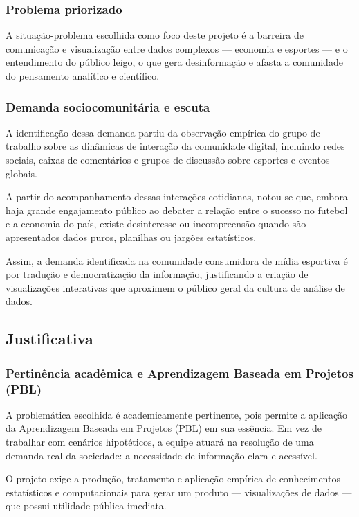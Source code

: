 \documentclass[12pt, a4paper, brazil]{article}
\begin{document}
\subsubsection{Problema priorizado}
A situação-problema escolhida como foco deste projeto é a barreira de comunicação e visualização entre dados complexos — economia e esportes — e o entendimento do público leigo, o que gera desinformação e afasta a comunidade do pensamento analítico e científico.

\subsubsection{Demanda sociocomunitária e escuta}
A identificação dessa demanda partiu da observação empírica do grupo de trabalho sobre as dinâmicas de interação da comunidade digital, incluindo redes sociais, caixas de comentários e grupos de discussão sobre esportes e eventos globais.

A partir do acompanhamento dessas interações cotidianas, notou-se que, embora haja grande engajamento público ao debater a relação entre o sucesso no futebol e a economia do país, existe desinteresse ou incompreensão quando são apresentados dados puros, planilhas ou jargões estatísticos.

Assim, a demanda identificada na comunidade consumidora de mídia esportiva é por tradução e democratização da informação, justificando a criação de visualizações interativas que aproximem o público geral da cultura de análise de dados.

\subsection{Justificativa}

\subsubsection{ Pertinência acadêmica e Aprendizagem Baseada em Projetos (PBL)}
A problemática escolhida é academicamente pertinente, pois permite a aplicação da Aprendizagem Baseada em Projetos (PBL) em sua essência. Em vez de trabalhar com cenários hipotéticos, a equipe atuará na resolução de uma demanda real da sociedade: a necessidade de informação clara e acessível.

O projeto exige a produção, tratamento e aplicação empírica de conhecimentos estatísticos e computacionais para gerar um produto — visualizações de dados — que possui utilidade pública imediata.
\end{document}
